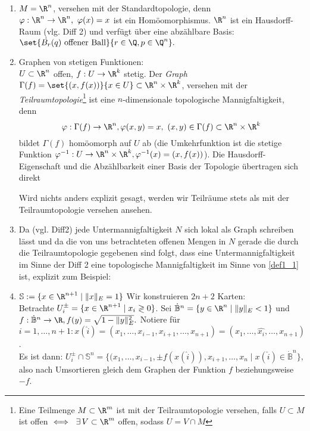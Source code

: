 \begin{exmp}
	\begin{enumerate}[label= {\roman*})]
		\item $M = \R^n$, versehen mit der Standardtopologie, denn $ \varphi: \R^n \to \R^n,\ \varphi(x) = x $ ist ein Homöomorphismus. $\R^n$ ist ein Hausdorff-Raum (vlg. Diff 2) und verfügt über eine abzählbare Basis: $ \set{\dot{B_r}(q) \ \text{offener Ball}}{r \in \Q, p \in \Q^n}. $
		\item Graphen von stetigen Funktionen:\\
			$ U \subset \R^n $ offen, $f: U \to \R^k$ stetig. Der \emph{Graph} $ \Gamma(f) = \set{(x,f(x))}{x \in U} \subset \R^n \times \R^k $, versehen mit der \emph{Teilraumtopologie}\footnote{
				Eine Teilmenge $M\subset \R^m$ ist mit der Teilraumtopologie versehen, falls $ U \subset M $ ist offen $ \iff \ \exists\, V \subset \R^m $ offen, sodass $ U = V \cap M $}
			ist eine $n$-dimensionale topologische Mannigfaltigkeit, denn $$ \varphi: \Gamma(f) \to \R^n, \varphi(x,y) = x,\ (x,y) \in \Gamma(f) \subset \R^n \times \R^k $$ bildet $\Gamma(f)$ homöomorph auf $U$ ab (die Umkehrfunktion ist die stetige Funktion $ \varphi^{-1}: U \to \R^n \times \R^k, \varphi^{-1}(x) = (x,f(x)) $). Die Hausdorff-Eigenschaft und die Abzählbarkeit einer Basis der Topologie übertragen sich direkt
			\begin{rem*}
				Wird nichts anders explizit gesagt, werden wir Teilräume stets als mit der Teilraumtopologie versehen ansehen.
			\end{rem*}
		\item Da (vgl. Diff2) jede Untermannigfaltigkeit $N$ sich lokal als Graph schreiben lässt und da die von uns betrachteten offenen Mengen in $N$ gerade die durch die Teilraumtopologie gegebenen sind folgt, dass eine Untermannigfaltigkeit im Sinne der Diff 2 eine topologische Mannigfaltigkeit im Sinne von \ref{def1_1} ist, explizit zum Beispiel:
		\item $\mathbb{S} := \{ x \in \R^{n+1} \mid \|x\|_E = 1 \} $
			Wir konstruieren $2n+2$ Karten:\\
			Betrachte $ U_i^\pm = \{ x \in \R^{n+1} \mid x_i \gtrless 0 \} $. Sei $ \dot{\mathbb{B}}^n = \{y \in \R^n \mid \|y\|_E < 1 \} $ und $ f: \dot{\mathbb{B}}^n \to \R, f(y) = \sqrt{1-\|y\|_E^2}. $ Notiere für $ i = 1,\dotsc,n+1: x(\hat{i}) = (x_1,\dots, x_{i-1},x_{i+1},\dotsc,x_{n+1}) = (x_1,\dotsc,\hat{x_i},\dotsc,x_{n+1}) $.\\
			Es ist dann: $ U_i^\pm \cap \mathbb{S}^n = \{ (x_1,\dotsc,x_{i-1}, \pm f(x(\hat{i})), x_{i+1},\dotsc,x_n \mid x(\hat{i}) \in \dot{\mathbb{B}}^n \}, $ also nach Umsortieren gleich dem Graphen der Funktion $f$ beziehungsweise $-f$.\\

\end{enumerate}
\end{exmp}
